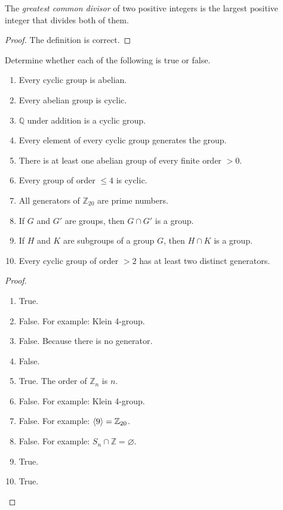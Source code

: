 \begin{exercise}
    The \textit{greatest common divisor} of two positive integers is the largest positive integer that divides both of them.
\end{exercise}

\begin{proof}
    The definition is correct.
\end{proof}

\begin{exercise}
    Determine whether each of the following is true or false.
    \begin{enumerate}[label={\textbf{\alph*.}}]
        \item Every cyclic group is abelian.
        \item Every abelian group is cyclic.
        \item $\mathbb{Q}$ under addition is a cyclic group.
        \item Every element of every cyclic group generates the group.
        \item There is at least one abelian group of every finite order $> 0$.
        \item Every group of order $\leq 4$ is cyclic.
        \item All generators of $\mathbb{Z}_{20}$ are prime numbers.
        \item If $G$ and $G'$ are groups, then $G\cap G'$ is a group.
        \item If $H$ and $K$ are subgroups of a group $G$, then $H\cap K$ is a group.
        \item Every cyclic group of order $> 2$ has at least two distinct generators.
    \end{enumerate}
\end{exercise}

\begin{proof}
    \begin{enumerate}[label={\textbf{\alph*.}}]
        \item True.
        \item False. For example: Klein 4-group.
        \item False. Because there is no generator.
        \item False.
        \item True. The order of $\mathbb{Z}_{n}$ is $n$.
        \item False. For example: Klein 4-group.
        \item False. For example: $\left\langle{9}\right\rangle = \mathbb{Z}_{20}$.
        \item False. For example: $S_{n} \cap \mathbb{Z} = \varnothing$.
        \item True.
        \item True.
    \end{enumerate}
\end{proof}

